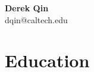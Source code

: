 \documentclass[letterpaper,11pt]{article}
\makeatletter
\newcommand{\resitem}[1]{\item #1 \vspace{-3pt}}
\newcommand{\edusubheading}[3]{
	\begin{tabular*}{7.0in}{l@{\extracolsep{\fill}}r}
		\textbf{#1}, #2 & \textit{#3} \\
\end{tabular*}\vspace{-6pt}}
\makeatother
\begin{document}
\begin{center}
	\textbf{\huge Derek Qin}\\
	dqin@caltech.edu\\
\end{center}

\section{Education}


%


	
\end{document}
